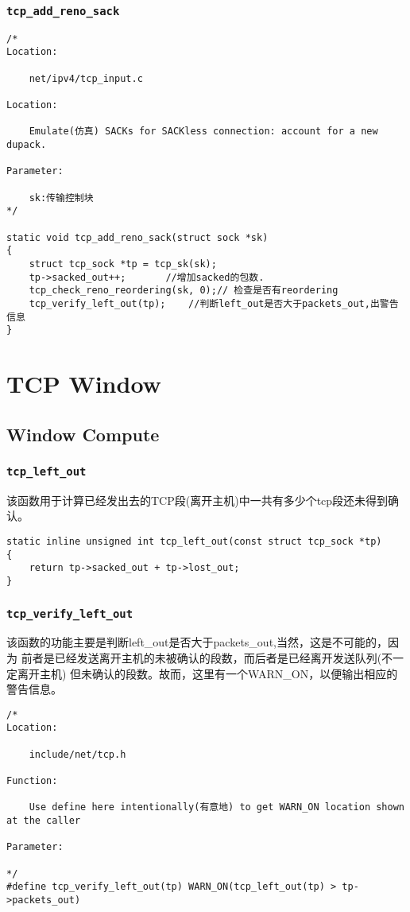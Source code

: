         \subsubsection{\texttt{tcp_add_reno_sack}}
\begin{verbatim}
/* 
Location:

    net/ipv4/tcp_input.c

Location:

    Emulate(仿真) SACKs for SACKless connection: account for a new dupack.

Parameter:

    sk:传输控制块
*/

static void tcp_add_reno_sack(struct sock *sk)
{
    struct tcp_sock *tp = tcp_sk(sk);
    tp->sacked_out++;       //增加sacked的包数.
    tcp_check_reno_reordering(sk, 0);// 检查是否有reordering
    tcp_verify_left_out(tp);    //判断left_out是否大于packets_out,出警告信息
}
\end{verbatim}
\section{TCP Window}
  	\subsection{Window Compute}
        \subsubsection{\texttt{tcp_left_out}}
            该函数用于计算已经发出去的TCP段(离开主机)中一共有多少个tcp段还未得到确认。
\begin{verbatim}
static inline unsigned int tcp_left_out(const struct tcp_sock *tp)
{
    return tp->sacked_out + tp->lost_out;
}
\end{verbatim}
        \subsubsection{\texttt{tcp_verify_left_out}}
            该函数的功能主要是判断left\_out是否大于packets\_out,当然，这是不可能的，因为
            前者是已经发送离开主机的未被确认的段数，而后者是已经离开发送队列(不一定离开主机)
            但未确认的段数。故而，这里有一个WARN\_ON，以便输出相应的警告信息。
\begin{verbatim}
/* 
Location:

    include/net/tcp.h

Function:

    Use define here intentionally(有意地) to get WARN_ON location shown at the caller 

Parameter:

*/
#define tcp_verify_left_out(tp) WARN_ON(tcp_left_out(tp) > tp->packets_out)     
\end{verbatim}

